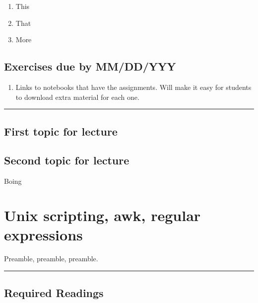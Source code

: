 \documentclass[]{book}
\providecommand{\tightlist}{%
  \setlength{\itemsep}{0pt}\setlength{\parskip}{0pt}}
\begin{document}
\begin{enumerate}
\def\labelenumi{\arabic{enumi}.}
\tightlist
\item
  This
\item
  That
\item
  More
\end{enumerate}

\hypertarget{exercises-due-by-mmddyyy-2}{%
\section*{Exercises due by MM/DD/YYY}\label{exercises-due-by-mmddyyy-2}}

\begin{enumerate}
\def\labelenumi{\arabic{enumi}.}
\tightlist
\item
  Links to notebooks that have the assignments. Will make it
  easy for students to download extra material for each one.
\end{enumerate}

\begin{center}\rule{0.5\linewidth}{\linethickness}\end{center}

\hypertarget{first-topic-for-lecture-2}{%
\section{First topic for lecture}\label{first-topic-for-lecture-2}}

\hypertarget{second-topic-for-lecture-2}{%
\section{Second topic for lecture}\label{second-topic-for-lecture-2}}

Boing

\hypertarget{unix-scripting-awk-regular-expressions}{%
\chapter{Unix scripting, awk, regular expressions}\label{unix-scripting-awk-regular-expressions}}

Preamble, preamble, preamble.

\begin{center}\rule{0.5\linewidth}{\linethickness}\end{center}

\hypertarget{required-readings-3}{%
\section*{Required Readings}\label{required-readings-3}}
\end{document}
